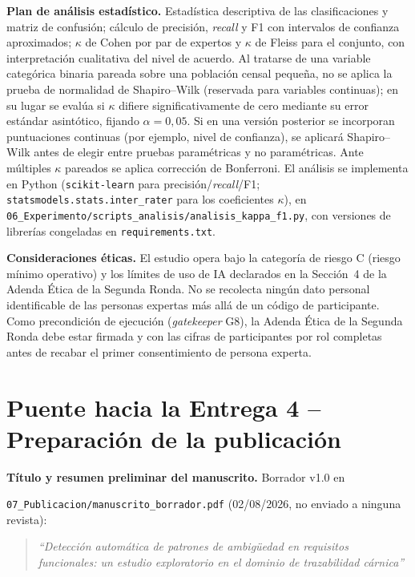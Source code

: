 \documentclass[11pt,a4paper]{article}
\begin{document}
\textbf{Plan de análisis estadístico.} Estadística descriptiva de las clasificaciones y matriz de confusión; cálculo de precisión, \textit{recall} y F1 con intervalos de confianza aproximados; \(\kappa\) de Cohen por par de expertos y \(\kappa\) de Fleiss para el conjunto, con interpretación cualitativa del nivel de acuerdo. Al tratarse de una variable categórica binaria pareada sobre una población censal pequeña, no se aplica la prueba de normalidad de Shapiro--Wilk (reservada para variables continuas); en su lugar se evalúa si \(\kappa\) difiere significativamente de cero mediante su error estándar asintótico, fijando \(\alpha = 0{,}05\). Si en una versión posterior se incorporan puntuaciones continuas (por ejemplo, nivel de confianza), se aplicará Shapiro--Wilk antes de elegir entre pruebas paramétricas y no paramétricas. Ante múltiples \(\kappa\) pareados se aplica corrección de Bonferroni. El análisis se implementa en Python (\texttt{scikit-learn} para precisión/\textit{recall}/F1; \texttt{statsmodels.stats.inter\_rater} para los coeficientes \(\kappa\)), en \texttt{06\_Experimento/scripts\_analisis/analisis\_kappa\_f1.py}, con versiones de librerías congeladas en \texttt{requirements.txt}.

\textbf{Consideraciones éticas.} El estudio opera bajo la categoría de riesgo C (riesgo mínimo operativo) y los límites de uso de IA declarados en la Sección~4 de la Adenda Ética de la Segunda Ronda. No se recolecta ningún dato personal identificable de las personas expertas más allá de un código de participante. Como precondición de ejecución (\textit{gatekeeper} G8), la Adenda Ética de la Segunda Ronda debe estar firmada y con las cifras de participantes por rol completas antes de recabar el primer consentimiento de persona experta.

\section{Puente hacia la Entrega 4 -- Preparación de la publicación}
\textbf{Título y resumen preliminar del manuscrito.} Borrador v1.0 en 

\texttt{07\_Publicacion/manuscrito\_borrador.pdf} (02/08/2026, no enviado a ninguna revista):

\begin{quote}
\small
\textit{``Detección automática de patrones de ambigüedad en requisitos funcionales: un estudio exploratorio en el dominio de trazabilidad cárnica''}
\end{quote}
\end{document}
